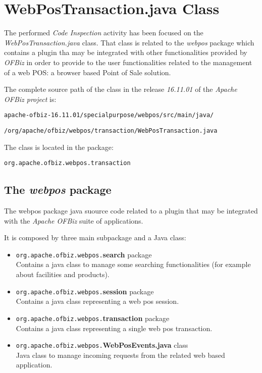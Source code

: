 \section{WebPosTransaction.java Class}
The performed \emph{Code Inspection} activity has been focused on the \emph{WebPosTransaction.java} class. That class is related to the \textit{webpos} package which contains a plugin tha may be integrated with other functionalities provided by \textit{OFBiz} in order to provide to the user functionalities related to the management of a web POS: a browser based Point of Sale solution.

The complete source path of the class in the release \emph{16.11.01} of the \emph{Apache OFBiz project} is:\\

\centerline{\tt apache-ofbiz-16.11.01/specialpurpose/webpos/src/main/java/}
\centerline{\tt /org/apache/ofbiz/webpos/transaction/WebPosTransaction.java} \hfill

The class is located in the package:\\
\centerline{\tt org.apache.ofbiz.webpos.transaction}

\subsection{The \textit{webpos} package}
The webpos package java suource code related to a plugin that may be integrated with the \emph{Apache OFBiz} suite of applications.

It is composed by three main subpackage and a Java class:
\begin{itemize}
	\item \texttt{org.apache.ofbiz.webpos.}\textbf{search} package\\Contains a java class to manage some searching functionalities (for example about facilities and products).
	\item \texttt{org.apache.ofbiz.webpos.}\textbf{session} package\\Contains a java class representing a web pos session.
	\item \texttt{org.apache.ofbiz.webpos.}\textbf{transaction} package\\Contains a java class representing  a single web pos transaction.
	\item \texttt{org.apache.ofbiz.webpos.}\textbf{WebPosEvents.java} class\\Java class to manage incoming requests from the related web based application.
\end{itemize}

